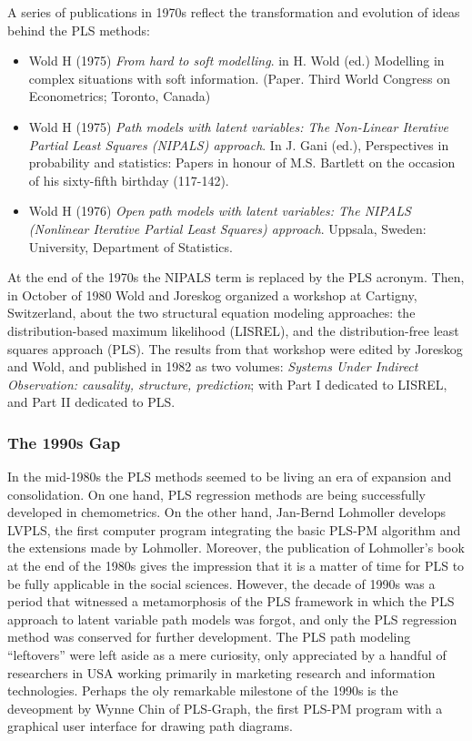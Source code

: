 \documentclass[12pt]{book}\usepackage{graphicx, color}
\begin{document}
A series of publications in 1970s reflect the transformation and evolution of ideas behind the PLS methods:

\begin{itemize}
 \item Wold H (1975) \textit{From hard to soft modelling}. in H. Wold (ed.) Modelling in complex situations with soft information. (Paper. Third World Congress on Econometrics; Toronto, Canada)
 \item Wold H (1975) \textit{Path models with latent variables: The Non-Linear Iterative Partial Least Squares (NIPALS) approach}. In J. Gani (ed.), Perspectives in probability and statistics: Papers in honour of M.S. Bartlett on the occasion of his sixty-fifth birthday (117-142).
 \item Wold H (1976) \textit{Open path models with latent variables: The NIPALS (Nonlinear Iterative Partial Least Squares) approach}. Uppsala, Sweden: University, Department of Statistics.
\end{itemize}

At the end of the 1970s the NIPALS term is replaced by the PLS acronym. Then, in October of 1980 Wold and Joreskog organized a workshop at Cartigny, Switzerland, about the two structural equation modeling approaches: the distribution-based maximum likelihood (LISREL), and the distribution-free least squares approach (PLS). The results from that workshop were edited by Joreskog and Wold, and published in 1982 as two volumes: \textit{Systems Under Indirect Observation: causality, structure, prediction}; with Part I dedicated to LISREL, and Part II dedicated to PLS.



\subsubsection*{The 1990s Gap}
In the mid-1980s the PLS methods seemed to be living an era of expansion and consolidation. On one hand, PLS regression methods are being successfully developed in chemometrics. On the other hand, Jan-Bernd Lohmoller develops LVPLS, the first computer program integrating the basic PLS-PM algorithm and the extensions made by Lohmoller. Moreover, the publication of Lohmoller's book at the end of the 1980s gives the impression that it is a matter of time for PLS to be fully applicable in the social sciences. However, the decade of 1990s was a period that witnessed a metamorphosis of the PLS framework in which the PLS approach to latent variable path models was forgot, and only the PLS regression method was conserved for further development. The PLS path modeling ``leftovers'' were left aside as a mere curiosity, only appreciated by a handful of researchers in USA working primarily in marketing research and information technologies. Perhaps the oly remarkable milestone of the 1990s is the deveopment by Wynne Chin of PLS-Graph, the first PLS-PM program with a graphical user interface for drawing path diagrams.
\end{document}
